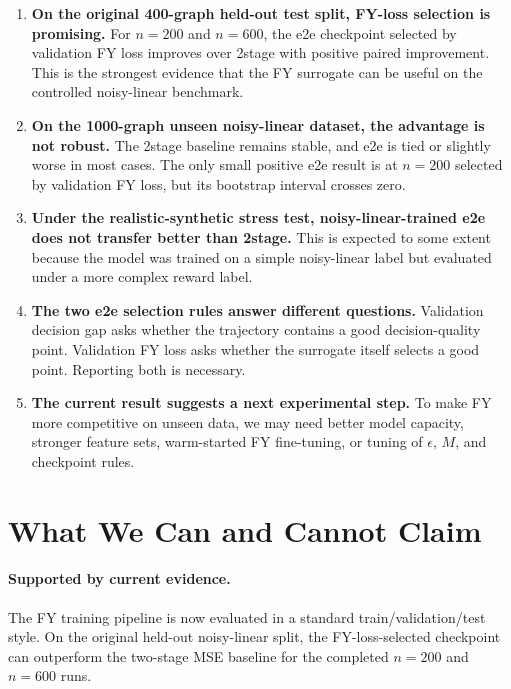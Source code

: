 \begin{enumerate}
    \item \textbf{On the original 400-graph held-out test split, FY-loss
    selection is promising.}
    For \(n=200\) and \(n=600\), the e2e checkpoint selected by validation FY
    loss improves over 2stage with positive paired improvement. This is the
    strongest evidence that the FY surrogate can be useful on the controlled
    noisy-linear benchmark.

    \item \textbf{On the 1000-graph unseen noisy-linear dataset, the advantage is
    not robust.}
    The 2stage baseline remains stable, and e2e is tied or slightly worse in
    most cases. The only small positive e2e result is at \(n=200\) selected by
    validation FY loss, but its bootstrap interval crosses zero.

    \item \textbf{Under the realistic-synthetic stress test, noisy-linear-trained
    e2e does not transfer better than 2stage.}
    This is expected to some extent because the model was trained on a simple
    noisy-linear label but evaluated under a more complex reward label.

    \item \textbf{The two e2e selection rules answer different questions.}
    Validation decision gap asks whether the trajectory contains a good
    decision-quality point. Validation FY loss asks whether the surrogate itself
    selects a good point. Reporting both is necessary.

    \item \textbf{The current result suggests a next experimental step.}
    To make FY more competitive on unseen data, we may need better model
    capacity, stronger feature sets, warm-started FY fine-tuning, or tuning of
    \(\epsilon\), \(M\), and checkpoint rules.
\end{enumerate}

\section{What We Can and Cannot Claim}

\paragraph{Supported by current evidence.}
The FY training pipeline is now evaluated in a standard train/validation/test
style. On the original held-out noisy-linear split, the FY-loss-selected
checkpoint can outperform the two-stage MSE baseline for the completed
\(n=200\) and \(n=600\) runs.

